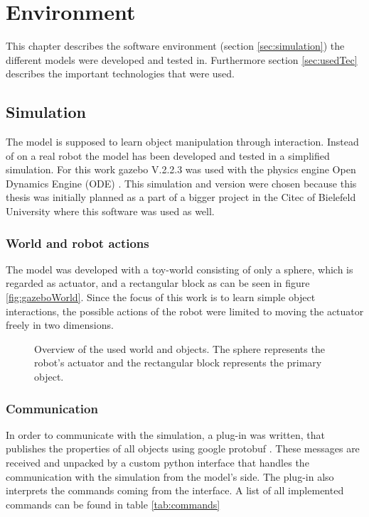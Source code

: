 \chapter{Environment\label{chap:env}}

This chapter describes the software environment (section \ref{sec:simulation}) 
the different models were developed and tested in. Furthermore section 
\ref{sec:usedTec} describes the important technologies that were used.

\section{Simulation\label{sec:simulation}}

The model is supposed to learn object manipulation through interaction. Instead of on a real robot the model has been developed and tested in a simplified simulation. For this work gazebo \cite{gazebo} V.2.2.3 was used with the physics engine Open Dynamics Engine (ODE) \cite{ode}. This simulation and version were chosen because this thesis was initially planned as a part of a bigger project in the Citec of Bielefeld University where this software was used as well. 

\subsection{World and robot actions}%

The model was developed with a toy-world consisting of only a sphere, which is 
regarded as actuator, and a rectangular block as can be seen in figure 
\ref{fig:gazeboWorld}.
Since the focus of this work is to learn simple object interactions, the 
possible actions of the robot were limited to moving the actuator freely in two 
dimensions.

\begin{figure} %
	\caption{Overview of the used world and objects. The sphere represents the 
	robot's actuator and the rectangular block represents the primary object.}
	\label{fig:gazeboWOrld}
\end{figure}


\subsection{Communication}
In order to communicate with the simulation, a plug-in was written, that publishes the properties of all objects using google protobuf \cite{protobuf}. These messages are received and unpacked by a custom python interface that handles the communication with the simulation from the model's side. The plug-in also interprets the commands coming from the interface. A list of all implemented commands can be found in table \ref{tab:commands}

